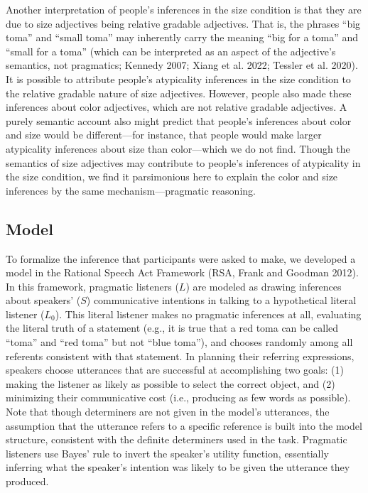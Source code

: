 \documentclass{ucetd}
\begin{document}
Another interpretation of people's inferences in the size condition is
that they are due to size adjectives being relative gradable adjectives.
That is, the phrases ``big toma'' and ``small toma'' may inherently
carry the meaning ``big for a toma'' and ``small for a toma'' (which can
be interpreted as an aspect of the adjective's semantics, not
pragmatics; Kennedy 2007; Xiang et al. 2022; Tessler et al. 2020). It is
possible to attribute people's atypicality inferences in the size
condition to the relative gradable nature of size adjectives. However,
people also made these inferences about color adjectives, which are not
relative gradable adjectives. A purely semantic account also might
predict that people's inferences about color and size would be
different---for instance, that people would make larger atypicality
inferences about size than color---which we do not find. Though the
semantics of size adjectives may contribute to people's inferences of
atypicality in the size condition, we find it parsimonious here to
explain the color and size inferences by the same mechanism---pragmatic
reasoning.

\hypertarget{model}{%
\subsection{Model}\label{model}}

To formalize the inference that participants were asked to make, we
developed a model in the Rational Speech Act Framework (RSA, Frank and
Goodman 2012). In this framework, pragmatic listeners (\(L\)) are
modeled as drawing inferences about speakers' (\(S\)) communicative
intentions in talking to a hypothetical literal listener (\(L_{0}\)).
This literal listener makes no pragmatic inferences at all, evaluating
the literal truth of a statement (e.g., it is true that a red toma can
be called ``toma'' and ``red toma'' but not ``blue toma''), and chooses
randomly among all referents consistent with that statement. In planning
their referring expressions, speakers choose utterances that are
successful at accomplishing two goals: (1) making the listener as likely
as possible to select the correct object, and (2) minimizing their
communicative cost (i.e., producing as few words as possible). Note that
though determiners are not given in the model's utterances, the
assumption that the utterance refers to a specific reference is built
into the model structure, consistent with the definite determiners used
in the task. Pragmatic listeners use Bayes' rule to invert the speaker's
utility function, essentially inferring what the speaker's intention was
likely to be given the utterance they produced.
\end{document}
